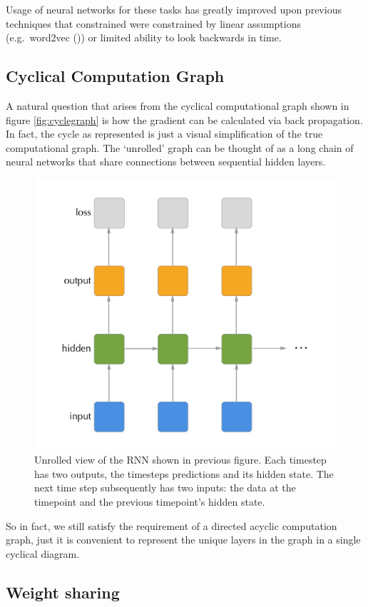 \documentclass[]{book}
\theoremstyle{definition}
\theoremstyle{definition}
\theoremstyle{definition}
\theoremstyle{remark}
\begin{document}
Usage of neural networks for these tasks has greatly improved upon
previous techniques that constrained were constrained by linear
assumptions (e.g.~word2vec (\citet{word2vec})) or limited ability to
look backwards in time.

\subsection{Cyclical Computation
Graph}\label{cyclical-computation-graph}

A natural question that arises from the cyclical computational graph
shown in figure \ref{fig:cyclegraph} is how the gradient can be
calculated via back propagation. In fact, the cycle as represented is
just a visual simplification of the true computational graph. The
`unrolled' graph can be thought of as a long chain of neural networks
that share connections between sequential hidden layers.

\begin{figure}

{\centering \includegraphics[width=0.65\linewidth]{figures/rnn_unrolled} 

}

\caption{Unrolled view of the RNN shown in previous figure. Each timestep has two outputs, the timesteps predictions and its hidden state. The next time step subsequently has two inputs: the data at the timepoint and the previous timepoint's hidden state.}\label{fig:unrolledgraph}
\end{figure}

So in fact, we still satisfy the requirement of a directed acyclic
computation graph, just it is convenient to represent the unique layers
in the graph in a single cyclical diagram.

\subsection{Weight sharing}\label{weight-sharing}
\end{document}
